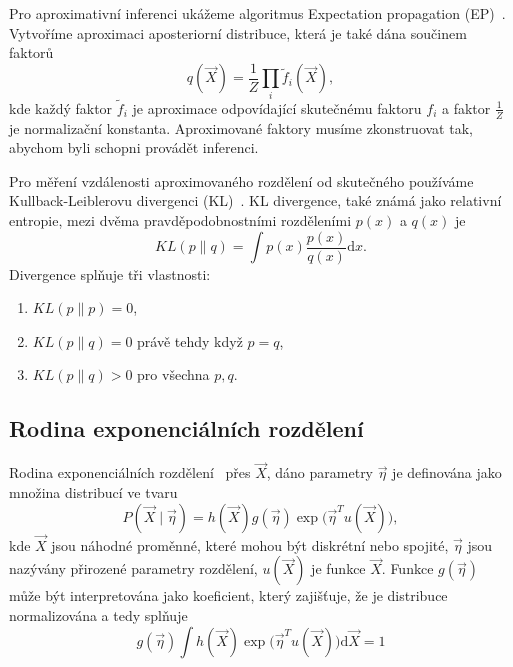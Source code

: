 Pro aproximativní inferenci ukážeme algoritmus Expectation propagation (EP)~\cite{minka2001expectation}.
Vytvoříme aproximaci aposteriorní distribuce, která je také dána součinem faktorů
\begin{equation}
q(\vec{X}) = \frac{1}{Z} \prod_i \tilde{f}_i(\vec{X}),
\end{equation}
kde každý faktor $\tilde{f}_i$ je aproximace odpovídající skutečnému faktoru $f_i$ a faktor $\frac{1}{Z}$ je normalizační konstanta.
Aproximované faktory musíme zkonstruovat tak, abychom byli schopni provádět inferenci.

Pro měření vzdálenosti aproximovaného rozdělení od skutečného používáme Kullback-Leiblerovu divergenci (KL)~\cite{kullback1997information}.
KL divergence, také známá jako relativní entropie, mezi dvěma pravděpodobnostními rozděleními $p(x)$ a $q(x)$ je
\begin{equation}
KL(p \| q) = \int p(x) \frac{p(x)}{q(x)} \mathrm{d}x.
\end{equation}
Divergence splňuje tři vlastnosti:
\begin{enumerate}
\item $KL(p \| p) = 0$,
\item $KL(p \| q) = 0$ právě tehdy když $p = q$,
\item $KL(p \| q) > 0$ pro všechna $p, q$.
\end{enumerate}

\subsection{Rodina exponenciálních rozdělení}

Rodina exponenciálních rozdělení~\cite{bernardo2009bayesian} přes $\vec{X}$, dáno parametry $\vec\eta$ je definována jako množina distribucí ve tvaru
\begin{equation}
P(\vec{X} \mid \vec\eta) = h(\vec{X}) g(\vec\eta) \exp \big(\vec\eta^T u(\vec{X})\big),
\label{eq:gj}
\end{equation}
kde $\vec{X}$ jsou náhodné proměnné, které mohou být diskrétní nebo spojité, $\vec\eta$ jsou nazývány přirozené parametry rozdělení, $u(\vec{X})$ je funkce $\vec{X}$.
Funkce $g(\vec\eta)$ může být interpretována jako koeficient, který zajišťuje, že je distribuce normalizována a tedy splňuje
\begin{equation}
g(\vec\eta) \int h(\vec{X}) \exp \big(\vec\eta^T u(\vec{X})\big) \mathrm{d}\vec{X} = 1
\label{eq:g1}
\end{equation}

